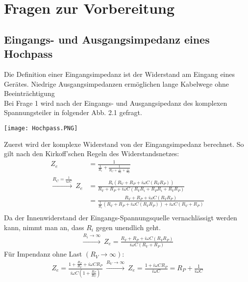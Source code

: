 

\chapter{Fragen zur Vorbereitung}
\label{chap:fvz}
\section{Eingangs- und Ausgangsimpedanz eines Hochpass}
Die Definition einer Eingangsimpedanz ist der Widerstand am Eingang eines Gerätes. Niedrige Ausgangsimpedanzen ermöglichen lange Kabelwege ohne Beeinträchtigung\\
Bei Frage 1 wird nach der Eingangs- und Ausgangsipedanz des komplexen Spannungsteiler in folgender Abb. 2.1 gefragt.
\begin{center}
    \texttt{[image: Hochpass.PNG]}
\end{center}
Zuerst wird der komplexe Widerstand von der Eingangsimpedanz berechnet. So gilt nach den Kirkoff'schen Regeln des Widerstandsnetzes:
\begin{equation}
    \begin{aligned}
        Z_e &= \frac{1}{\frac{1}{R_i}+\frac{1}{R_C+{\frac{1}{R_V}+\frac{1}{R_P}}}}\\[0.3cm]
        \xrightarrow{R_C=\frac{1}{i\omega C}}~Z_e &=\frac{R_i(R_V+R_P+i\omega C(R_VR_P))}{R_V+R_P+i\omega C(R_VR_i+R_PR_i+R_VR_P)}\\[0.3cm]
        &= \frac{R_V+R_P+i\omega C(R_VR_P)}{\frac{1}{R_i}(R_V+R_P+i\omega C(R_VR_P))+i\omega C(R_V+R_P)}\\
    \end{aligned}
\end{equation}
Da der Innenwiderstand der Eingangs-Spannungsquelle vernachlässigt werden kann, nimmt man an, dass $R_i$ gegen unendlich geht.\\
\begin{align}
    \xrightarrow{R_i\rightarrow\infty}~Z_e=\frac{R_V+R_P+i\omega C(R_VR_P)}{i\omega C(R_V+R_P)}
\end{align}
Für Impendanz ohne Last $(R_V\longrightarrow\infty)$:
\begin{align}
    Z_e=\frac{1+\frac{R_P}{R_V}+i\omega C R_P}{i\omega C(1+\frac{R_P}{R_V})}~\xrightarrow{R_V\rightarrow\infty}~Z_e=\frac{1+i\omega CR_P}{i\omega C} = R_P+\frac{1}{i\omega C}
\end{align}
